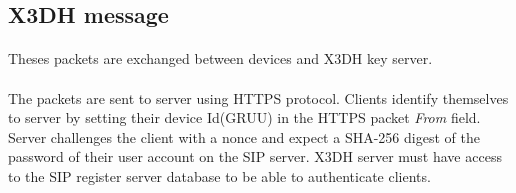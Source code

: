 \documentclass[a4paper,11pt]{article}
\begin{document}
  \subsection{X3DH message}
    \paragraph{}Theses packets are exchanged between devices and X3DH key server.
    \paragraph*{}The packets are sent to server using HTTPS protocol. Clients identify themselves to server by setting their device Id(GRUU) in the HTTPS packet \textit{From} field. Server challenges the client with a nonce and expect a SHA-256 digest of the password of their user account on the SIP server. X3DH server must have access to the SIP register server database to be able to authenticate clients.
\end{document}
